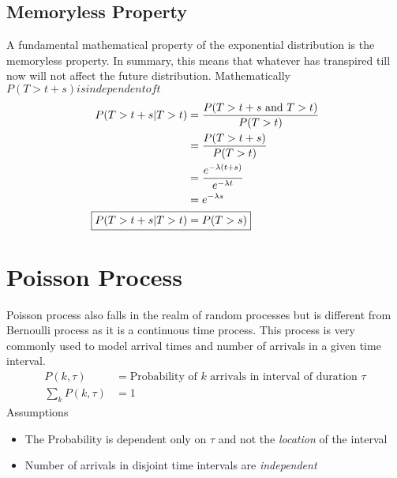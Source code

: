 \documentclass[11pt, a4paper]{article}
\begin{document}
    \subsection{Memoryless Property}
    A fundamental mathematical property of the exponential distribution is the memoryless property. In summary, this means that whatever has transpired till now will not affect the future distribution. Mathematically $P(T > t+s) is independent of t$
    \begin{align*}
        P(T > t+s | T>t) &= \frac{P(T> t+s \text{ and }T > t)}{P(T > t)}\\
        &= \frac{P(T > t + s)}{P(T > t)}\\
        &= \frac{e^{-\lambda(t+s)}}{e^{-\lambda t}}\\
        &= e^{-\lambda s}\\
        \Aboxed{P(T > t+s | T>t) &= P(T > s)}
    \end{align*}


    \section{Poisson Process}
    Poisson process also falls in the realm of random processes but is different from Bernoulli process as it is a continuous time process. This process is very commonly used to model arrival times and number of arrivals in a given time interval.
    \begin{align*}
        P(k, \tau) &= \text{Probability of $k$ arrivals in interval of duration $\tau$}\\
        \sum_{k} P(k, \tau) &= 1 \tag*{for a given $\tau$}
    \end{align*}
    Assumptions
    \begin{itemize}
        \item The Probability is dependent only on $\tau$ and not the \emph{location} of the interval
        \item Number of arrivals in disjoint time intervals are \emph{independent}
    \end{itemize}
    
\end{document}
